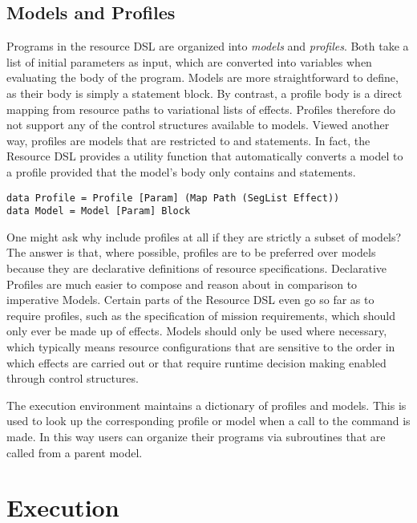 \documentclass[12pt,oneside]{book}
\begin{document}
\subsection{Models and Profiles}

Programs in the resource DSL are organized into \emph{models} and \emph{profiles}. Both take a list of
initial parameters as input, which are converted into variables when evaluating the body of the program. Models are more straightforward to define,
as their body is simply a statement block. By contrast, a profile body is a direct mapping from resource paths to variational lists of effects. Profiles
therefore do not support any of the control structures available to models. Viewed another way, profiles are models that are restricted to 
and  statements. In fact, the Resource DSL provides a utility function  that automatically converts a model to a profile provided
that the model's body only contains  and  statements.

\begin{lstlisting}
data Profile = Profile [Param] (Map Path (SegList Effect))
data Model = Model [Param] Block
\end{lstlisting}

One might ask why include profiles at all if they are strictly a subset of models? The answer is that, where possible, profiles
are to be preferred over models because they are declarative definitions of resource specifications. Declarative Profiles
are much easier to compose and reason about in comparison to imperative Models. Certain parts of the Resource DSL
even go so far as to require profiles, such as the specification of mission requirements, which should only ever be made up
of  effects. Models should only be used where necessary, which typically means resource configurations that are
sensitive to the order in which effects are carried out or that require runtime decision making enabled through control structures.

The execution environment maintains a dictionary of profiles and models. This is used to look up the corresponding profile or
model when a call to the  command is made. In this way users can organize their programs via subroutines that are
called from a parent model.


\section{Execution} 
\end{document}
